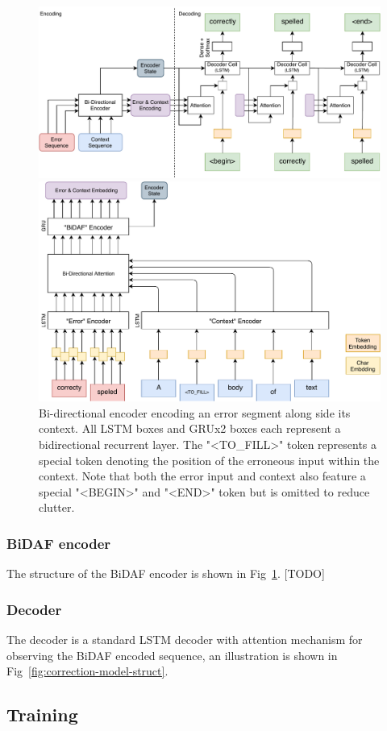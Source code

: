\begin{figure}
    \centering
    \includegraphics[width=.8\linewidth]{diagrams/correction-seq2seq-model.pdf}
    \caption{Structure of the proposed error correction Seq2Seq model. The model can be viewed as two separated parts: the encoder and decoder, denoted by the dotted line. This figure highlights the decoder, a detailed view of the encoder is shown in Fig~\ref{fig:bidaf-encoder}. Three parallel arrows represent passing a sequence of vectors while a single arrow represent a single vector. White box without a label represents a concatenation operation. Orange box represents an token embedding layer.}
    \label{fig:correction-model-struct}
    \centering
    \includegraphics[width=.8\linewidth]{diagrams/bidaf-encoder.pdf}
    \caption{Bi-directional encoder encoding an error segment along side its context. All LSTM boxes and GRUx2 boxes each represent a bidirectional recurrent layer. The "<TO\_FILL>" token represents a special token denoting the position of the erroneous input within the context. Note that both the error input and context also feature a special "<BEGIN>" and "<END>" token but is omitted to reduce clutter.}
    \label{fig:bidaf-encoder}
\end{figure}

\subsubsection*{BiDAF encoder}
The structure of the BiDAF encoder is shown in Fig~\ref{fig:bidaf-encoder}. [TODO]

\subsubsection*{Decoder}
The decoder is a standard LSTM decoder with attention mechanism for observing the BiDAF encoded sequence, an illustration is shown in Fig~\ref{fig:correction-model-struct}.

\subsection{Training}
